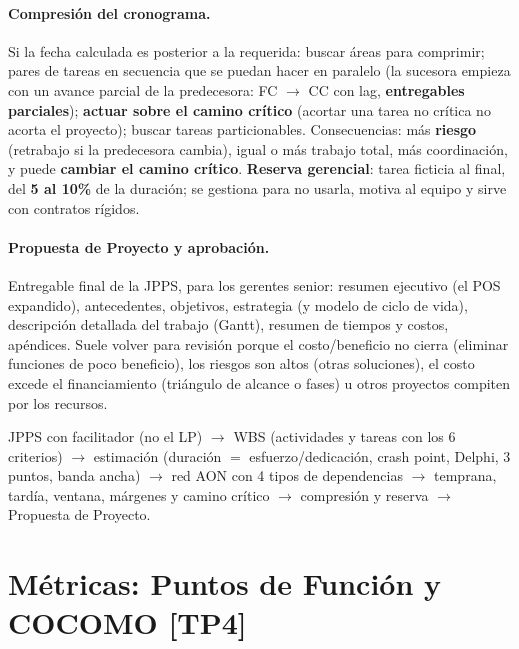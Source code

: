\documentclass[11pt,a4paper]{article}
\begin{document}
\paragraph{Compresión del cronograma.} Si la fecha calculada es posterior a la requerida: buscar áreas para
comprimir; pares de tareas en secuencia que se puedan hacer en paralelo (la sucesora empieza con un avance
parcial de la predecesora: FC $\to$ CC con lag, \textbf{entregables parciales}); \textbf{actuar sobre el camino
crítico} (acortar una tarea no crítica no acorta el proyecto); buscar tareas particionables. Consecuencias: más
\textbf{riesgo} (retrabajo si la predecesora cambia), igual o más trabajo total, más coordinación, y puede
\textbf{cambiar el camino crítico}. \textbf{Reserva
gerencial}: tarea ficticia al final, del \textbf{5 al 10\%} de la duración; se gestiona para no usarla,
motiva al equipo y sirve con contratos rígidos.

\paragraph{Propuesta de Proyecto y aprobación.} Entregable final de la JPPS, para los gerentes senior: resumen
ejecutivo (el POS expandido), antecedentes, objetivos, estrategia (y modelo de ciclo de vida), descripción
detallada del trabajo (Gantt), resumen de tiempos y costos, apéndices. Suele volver para revisión porque el
costo/beneficio no cierra (eliminar funciones de poco beneficio), los riesgos son altos (otras soluciones), el
costo excede el financiamiento (triángulo de alcance o fases) u otros proyectos compiten por los recursos.

\begin{enresumen}
JPPS con facilitador (no el LP) $\to$ WBS (actividades y tareas con los 6 criterios) $\to$ estimación
(duración $=$ esfuerzo/dedicación, crash point, Delphi, 3 puntos, banda ancha) $\to$ red AON con 4 tipos de
dependencias $\to$ temprana, tardía, ventana, márgenes y camino crítico $\to$ compresión y reserva $\to$
Propuesta de Proyecto.
\end{enresumen}

\section[Métricas: Puntos de Función y COCOMO]{Métricas: Puntos de Función y COCOMO \hfill {\normalsize [TP4]}}
\end{document}
